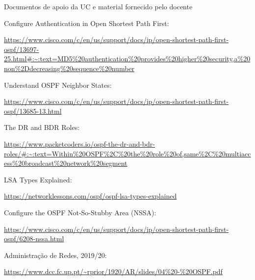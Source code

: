 \documentclass[11pt,english, openright, oneside]{book}
\begin{document}
\begin{thebibliography}{4} %
   Documentos de apoio da UC e material fornecido pelo docente

   Configure Authentication in Open Shortest Path First:\par 
  \url{https://www.cisco.com/c/en/us/support/docs/ip/open-shortest-path-first-ospf/13697-25.html#:~:text=MD5%20authentication%20provides%20higher%20security,a%20non%2Ddecreasing%20sequence%20number}

   Understand OSPF Neighbor States:\par 
  \url{https://www.cisco.com/c/en/us/support/docs/ip/open-shortest-path-first-ospf/13685-13.html}

   The DR and BDR Roles:\par 
  \url{https://www.packetcoders.io/ospf-the-dr-and-bdr-roles/#:~:text=Within%20OSPF%2C%20the%20role%20of,same%2C%20multiaccess%20broadcast%20network%20segment}

   LSA Types Explained:\par 
  \url{https://networklessons.com/ospf/ospf-lsa-types-explained}

   Configure the OSPF Not-So-Stubby Area (NSSA):\par 
  \url{https://www.cisco.com/c/en/us/support/docs/ip/open-shortest-path-first-ospf/6208-nssa.html}
    
   Administração
  de Redes,  2019/20: \par
  \url{https://www.dcc.fc.up.pt/~rprior/1920/AR/slides/04%20-%20OSPF.pdf}
\end{thebibliography}

\mainmatter
\end{document}
